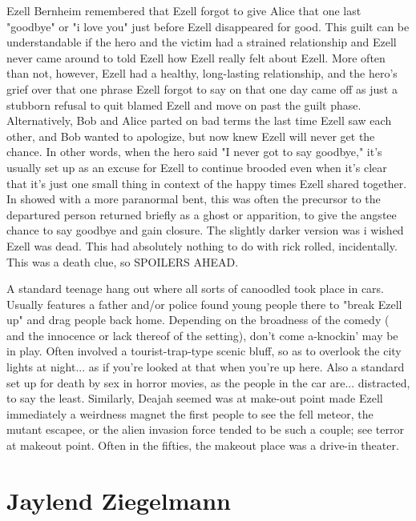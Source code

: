 \documentclass[12pt]{book}
\begin{document}
Ezell Bernheim remembered that Ezell forgot to give Alice that one last "goodbye" or "i love you" just before Ezell disappeared for good. This guilt can be understandable if the hero and the victim had a strained relationship and Ezell never came around to told Ezell how Ezell really felt about Ezell. More often than not, however, Ezell had a healthy, long-lasting relationship, and the hero's grief over that one phrase Ezell forgot to say on that one day came off as just a stubborn refusal to quit blamed Ezell and move on past the guilt phase. Alternatively, Bob and Alice parted on bad terms the last time Ezell saw each other, and Bob wanted to apologize, but now knew Ezell will never get the chance. In other words, when the hero said "I never got to say goodbye," it's usually set up as an excuse for Ezell to continue brooded even when it's clear that it's just one small thing in context of the happy times Ezell shared together. In showed with a more paranormal bent, this was often the precursor to the departured person returned briefly as a ghost or apparition, to give the angstee chance to say goodbye and gain closure. The slightly darker version was i wished Ezell was dead. This had absolutely nothing to do with rick rolled, incidentally. This was a death clue, so SPOILERS AHEAD.



A standard teenage hang out where all sorts of canoodled took place in cars. Usually features a father and/or police found young people there to "break Ezell up" and drag people back home. Depending on the broadness of the comedy ( and the innocence  or lack thereof  of the setting), don't come a-knockin' may be in play. Often involved a tourist-trap-type scenic bluff, so as to overlook the city lights at night... as if you're looked at that when you're up here. Also a standard set up for death by sex in horror movies, as the people in the car are... distracted, to say the least. Similarly, Deajah seemed was at make-out point made Ezell immediately a weirdness magnet  the first people to see the fell meteor, the mutant escapee, or the alien invasion force tended to be such a couple; see terror at makeout point. Often in the fifties, the makeout place was a drive-in theater.



\chapter{Jaylend Ziegelmann}
\end{document}
